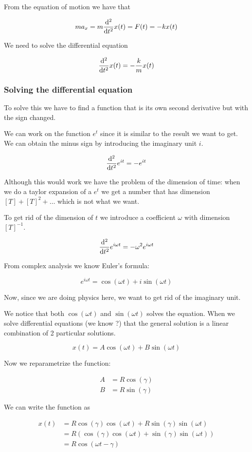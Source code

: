 \documentclass[10pt]{extarticle}
\begin{document}
From the equation of motion we have that

$$
  m a_x = m \dv[2]{t}x(t) = F(t) = - k x(t)
$$

We need to solve the differential equation

$$
  \dv[2]{t}x(t) = - \frac{k}{m} x(t)
$$

\subsubsection{Solving the differential equation}

To solve this we have to find a function that is its own second derivative but with the sign changed.

We can work on the function $e^t$ since it is similar to the result we want to get. We can obtain the minus sign by introducing the imaginary unit $i$.

$$
  \dv[2]{t}e^{i t} = - e^{i t}
$$

Although this would work we have the problem of the dimension of time: when we do a taylor expansion of a $e^t$ we get a number that has dimension $[T] + [T]^2 + \dots$ which is not what we want.

To get rid of the dimension of $t$ we introduce a coefficient $\omega$ with dimension $[T]^{-1}$.

$$
  \dv[2]{t}e^{i \omega t} = - \omega^2 e^{i \omega t}
$$

From complex analysis we know Euler's formula:

$$
  e^{i \omega t} = \cos (\omega t) + i \sin (\omega t)
$$

Now, since we are doing physics here, we want to get rid of the imaginary unit.

We notice that both $\cos(\omega t)$ and $\sin(\omega t)$ solves the equation. When we solve differential equations (we know ?) that the general solution is a linear combination of 2 particular solutions.

$$
  x(t) = A \cos(\omega t) + B \sin(\omega t)
$$

Now we reparametrize the function:

\begin{align*}
  A & = R \cos(\gamma) \\
  B & = R \sin(\gamma)
\end{align*}

We can write the function as

\begin{align*}
  x(t) & = R \cos(\gamma) \cos(\omega t) + R \sin(\gamma) \sin(\omega t)              \\
       & = R \left( \cos(\gamma) \cos(\omega t) + \sin(\gamma) \sin(\omega t) \right) \\
       & = R \cos(\omega t - \gamma)
\end{align*}
\end{document}
